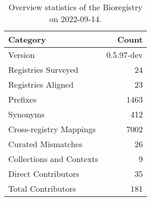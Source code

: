 \begin{table}
\centering
\caption{Overview statistics of the Bioregistry on 2022-09-14.}
\label{tab:bioregistry-summary}
\begin{tabular}{lr}
\toprule
                Category &      Count \\
\midrule
                 Version & 0.5.97-dev \\
     Registries Surveyed &         24 \\
      Registries Aligned &         23 \\
                Prefixes &       1463 \\
                Synonyms &        412 \\
 Cross-registry Mappings &       7002 \\
      Curated Mismatches &         26 \\
Collections and Contexts &          9 \\
     Direct Contributors &         35 \\
      Total Contributors &        181 \\
\bottomrule
\end{tabular}
\end{table}
